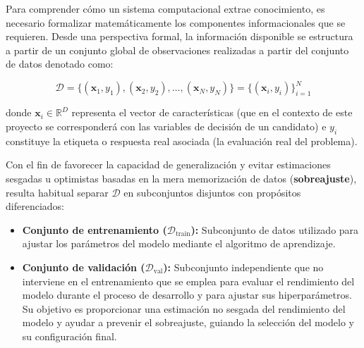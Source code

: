 Para comprender cómo un sistema computacional extrae conocimiento, es necesario formalizar matemáticamente los componentes informacionales que se requieren. Desde una perspectiva formal, la información disponible se estructura a partir de un conjunto global de observaciones realizadas a partir del conjunto de datos denotado como:

\begin{equation}
    \mathcal{D} = \{(\mathbf{x}_1, y_1), (\mathbf{x}_2, y_2), \dots, (\mathbf{x}_N, y_N)\} = \{(\mathbf{x}_i, y_i)\}_{i=1}^N
\end{equation}

\noindent donde $\mathbf{x}_i \in \mathbb{R}^D$ representa el vector de características (que en el contexto de este proyecto se corresponderá con las variables de decisión de un candidato) e $y_i$ constituye la etiqueta o respuesta real asociada (la evaluación real del problema).

Con el fin de favorecer la capacidad de generalización y evitar estimaciones
sesgadas u optimistas basadas en la mera memorización de datos
(\textbf{sobreajuste}), resulta habitual separar \(\mathcal{D}\) en
subconjuntos disjuntos con propósitos diferenciados:


\begin{itemize}
    \item \textbf{Conjunto de entrenamiento ($\mathcal{D}_{\text{train}}$):} Subconjunto de datos utilizado para ajustar los parámetros del modelo mediante el algoritmo de aprendizaje.
    \item \textbf{Conjunto de validación ($\mathcal{D}_{\text{val}}$):} Subconjunto independiente que no interviene en el entrenamiento que se emplea para evaluar el rendimiento del modelo durante el proceso de desarrollo y para ajustar sus hiperparámetros. Su objetivo es proporcionar una estimación no sesgada del rendimiento del modelo y ayudar a prevenir el sobreajuste, guiando la selección del modelo y su configuración final.
\end{itemize}

